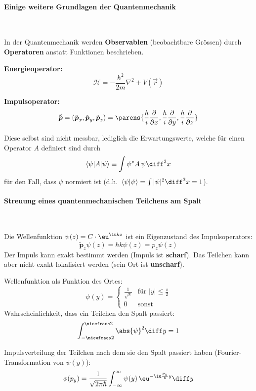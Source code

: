 		\paragraph{Einige weitere Grundlagen der Quantenmechanik} %
			~
		
			In der Quantenmechanik werden \textbf{Observablen} (beobachtbare Grössen) durch \textbf{Operatoren} anstatt Funktionen beschrieben.
		
			\textbf{Energieoperator:}
			\[
				\mathscr H = - \frac{\hbar^2}{2m} \nabla^2 + V(\vec r)
			\]
		
			\textbf{Impulsoperator:}
			\[
				\vec{\tilde{\boldsymbol p}} = (\tilde{\boldsymbol p}_x,
					\tilde{\boldsymbol p}_y, \tilde{\boldsymbol p}_z) = \parens{
					\frac{\hbar}{i} \frac{\partial}{\partial x},
					\frac{\hbar}{i} \frac{\partial}{\partial y},
					\frac{\hbar}{i} \frac{\partial}{\partial z}
				}
			\]
		
			Diese selbst sind nicht messbar, lediglich die Erwartungswerte, welche für einen Operator $A$ definiert sind durch
			\[
				\langle \psi |A| \psi \rangle \equiv \int \psi^* A \,\psi \diff^3 x
			\]
			für den Fall, dass $\psi$ normiert ist (d.h.~$\langle \psi | \psi \rangle = \int |\psi|^2 \diff^3 x = 1$).
		\paragraph{Streuung eines quantenmechanischen Teilchens am Spalt} %
			~
			
			Die Wellenfunktion $\psi(z) = C\cdot \eu^{\iu kz}$ ist ein Eigenzustand des Impulsoperators:
			\[
				\tilde{\boldsymbol p}_z \psi(z) = \hbar k \psi(z) = p_z \psi(z)
			\]
			Der Impuls kann exakt bestimmt werden (Impuls ist \textbf{scharf}). Das Teilchen kann aber nicht exakt lokalisiert werden (sein Ort ist \textbf{unscharf}).
			
			Wellenfunktion als Funktion des Ortes:
			\[
				\psi(y) = \left\{\begin{array}{cl}
					\frac{1}{\sqrt{s}} & \text{für } |y| \le \frac{s}{2} \\
					0 & \text{sonst}
				\end{array}\right.
			\]
			Wahrscheinlichkeit, dass ein Teilchen den Spalt passiert:
			\[
				\int_{-\nicefrac s 2}^{\nicefrac s 2} \abs{\psi}^2 \diff y = 1
			\]
			
			Impulsverteilung der Teilchen nach dem sie den Spalt passiert haben (Fourier-Transformation von $\psi(y)$):
			\[
				\phi(p_y) = \frac{1}{\sqrt{2\pi\hbar}} \int_{-\infty}^\infty \psi(y)\, \eu^{-\iu \frac{p_y}{\hbar}y} \diff y
			\]
			
